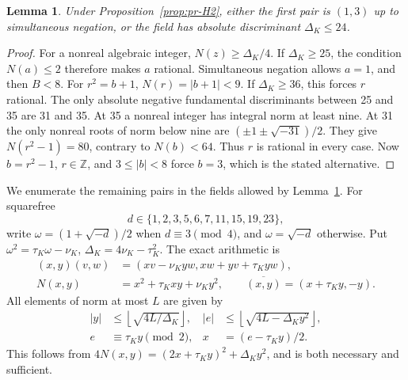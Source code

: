 \documentclass[12pt]{article}
\newtheorem{lemma}[theorem]{Lemma}
\numberwithin{equation}{section}
\begin{document}
\begin{lemma}\label{lem:pr-field}
Under Proposition~\ref{prop:pr-H2}, either the first pair is
$(1,3)$ up to simultaneous negation, or the field has absolute
discriminant $\Delta_K\le24$.
\end{lemma}
\begin{proof}
For a nonreal algebraic integer, \(N(z)\ge\Delta_K/4\).
If \(\Delta_K\ge25\), the condition \(N(a)\le2\) therefore makes
\(a\) rational. Simultaneous negation allows \(a=1\), and then
\(B<8\). For \(r^2=b+1\),
\(N(r)=|b+1|<9\). If \(\Delta_K\ge36\), this forces \(r\) rational.
The only absolute negative fundamental discriminants between 25 and 35
are 31 and 35. At 35 a nonreal integer has integral norm at least nine.
At 31 the only nonreal roots of norm below nine are
$(\pm1\pm\sqrt{-31})/2$. They give \(N(r^2-1)=80\), contrary to
\(N(b)<64\). Thus \(r\) is rational in every case. Now
$b=r^2-1$, $r\in\mathbb Z$, and $3\le|b|<8$ force $b=3$,
which is the stated alternative.
\end{proof}

We enumerate the remaining pairs in the fields allowed by
Lemma~\ref{lem:pr-field}. For squarefree
\[
 d\in\{1,2,3,5,6,7,11,15,19,23\},
\]
write \(\omega=(1+\sqrt{-d})/2\) when \(d\equiv3\pmod4\), and
\(\omega=\sqrt{-d}\) otherwise. Put
\(\omega^2=\tau_K\omega-\nu_K\), \(\Delta_K=4\nu_K-\tau_K^2\).
The exact arithmetic is
\begin{equation}\label{eq:pr-ring-arithmetic}
\begin{aligned}
 (x,y)(v,w)&=(xv-\nu_Kyw,xw+yv+\tau_Kyw),\\
 N(x,y)&=x^2+\tau_Kxy+\nu_Ky^2,\qquad
 \overline{(x,y)}=(x+\tau_Ky,-y).
\end{aligned}
\end{equation}
All elements of norm at most \(L\) are given by
\begin{equation}\label{eq:pr-disk}
\begin{aligned}
 |y|&\le\left\lfloor\sqrt{4L/\Delta_K}\right\rfloor,&
 |e|&\le\left\lfloor\sqrt{4L-\Delta_Ky^2}\right\rfloor,\\
 e&\equiv\tau_Ky\pmod2,&x&=(e-\tau_Ky)/2.
\end{aligned}
\end{equation}
This follows from \(4N(x,y)=(2x+\tau_Ky)^2+\Delta_Ky^2\), and is both
necessary and sufficient.
\end{document}
